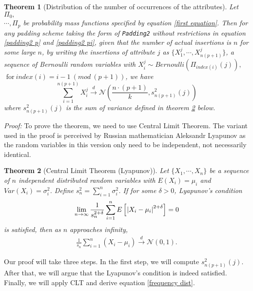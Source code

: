 \documentclass[10pt]{book}
\newtheorem{theorem}{Theorem}
\begin{document}
\begin{theorem}[Distribution of the number of occurrences of the attributes] \label{thm frequency dist}
Let $\Pi_0,$ \\ $\cdots, \Pi_p$ be probability mass functions specified by equation \ref{first equation}. Then for any padding scheme taking the form of \texttt{Padding2} without restrictions in equation \ref{padding2 p} and \ref{padding2 pi}, given that the number of actual insertions is $n$ for some large $n$, by writing the insertions of attribute $j$ as $\{X_1^j, \cdots, X_{n(p+1)}^j\}$, a sequence of Bernoulli random variables with $X_i^j \sim Bernoulli(\Pi_{index(i)}(j)),$ \\$ \text{ for} \ index(i) = i - 1 \ (mod \ (p+1))$, we have
\begin{equation}
	\sum_{i=1}^{n(p+1)} X_i^j \xrightarrow[]{d} \mathcal{N}(\frac{n \cdot (p+1)}{k}, s_{n(p+1)}^2(j)) \label{frequency dist}
\end{equation}
where $s_{n(p+1)}^2(j)$ is the sum of variance defined in theorem \ref{CLT} below.
\end{theorem} 


\textit{Proof: } To prove the theorem, we need to use Central Limit Theorem. The variant used in the proof is perceived by Russian mathematician Aleksandr Lyapunov as the random variables in this version only need to be independent, not necessarily identical.


\begin{theorem}[Central Limit Theorem (Lyapunov)] \label{CLT}
Let $\{X_1, \cdots, X_n\}$ be a sequence of $n$ independent distributed random variables with $E(X_i) = \mu_i$ and $Var(X_i) = \sigma_i^2$. Define $s_n^2 = \sum_{i = 1}^{n} \sigma_i^2$. If for some $\delta > 0$, Lyapunov's condition \\
\begin{align*}
	\lim_{n \rightarrow \infty} \frac{1}{s_{n}^{2+\delta}} \sum_{i=1}^{n} E\left[\:\abs{X_i - \mu_i}^{2+\delta}\right] = 0
\end{align*}
is satisfied, then as $n$ approaches infinity,
\begin{align*}
	\frac{1}{s_n} \sum_{i=1}^{n} (X_i - \mu_i) \xrightarrow[]{d} \mathcal{N}(0, 1).
\end{align*}
\end{theorem}


Our proof will take three steps. In the first step, we will compute $s_{n(p+1)}^2(j)$. After that, we will argue that the Lyapunov's condition is indeed satisfied. Finally, we will apply CLT and derive equation \ref{frequency dist}.
\end{document}

